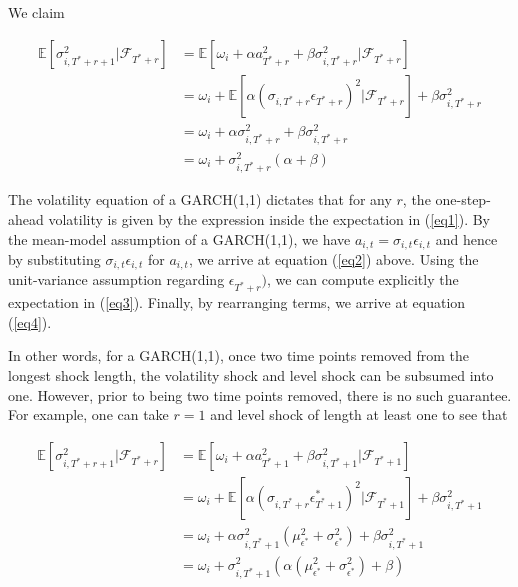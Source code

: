 \documentclass[11pt]{article}
\theoremstyle{definition}
\newenvironment{proof-of-proposition}[1][{}]{\noindent{\bf
    Proof of Proposition {#1}}
  \hspace*{.5em}}{\qed\bigskip\\}
\begin{document}
\begin{proof-of-proposition}
We claim

\begin{align}
\mathbb{E}[ \sigma^{2}_{i,T^{*}+r+1} |\mathcal{F}_{T^{*}+r}] & = \mathbb{E}[\omega_{i} + \alpha a_{T^{*}+r}^{2} + \beta\sigma^{2}_{i,T^{*}+r} |\mathcal{F}_{T^{*}+r}] \label{eq1}\\
& = \omega_{i} + \mathbb{E}[\alpha(\sigma_{i,T^{*}+r}\epsilon_{T^{*}+r})^{2} |\mathcal{F}_{T^{*}+r}] + \beta\sigma^{2}_{i,T^{*}+r} \label{eq2}\\
& = \omega_{i} + \alpha\sigma_{i,T^{*}+r}^{2} + \beta\sigma^{2}_{i,T^{*}+r} \label{eq3}\\
& = \omega_{i} + \sigma^{2}_{i,T^{*}+r}(\alpha + \beta) \label{eq4}
\end{align}

The volatility equation of a GARCH(1,1) dictates that for any $r$, the one-step-ahead volatility is given by the expression inside the expectation in (\ref{eq1}).  By the mean-model assumption of a GARCH(1,1), we have $a_{i,t} = \sigma_{i,t}\epsilon_{i,t}$ and hence by substituting $\sigma_{i,t}\epsilon_{i,t}$ for $a_{i,t}$, we arrive at equation (\ref{eq2}) above.  Using the unit-variance assumption regarding $\epsilon_{T^{*}+r})$, we can compute explicitly the expectation in (\ref{eq3}).  Finally, by rearranging terms, we arrive at equation (\ref{eq4}).
\end{proof-of-proposition}

In other words, for a GARCH(1,1), once two time points removed from the longest shock length, the volatility shock and level shock can be subsumed into one.  However, prior to being two time points removed, there is no such guarantee.  For example, one can take $r = 1$ and level shock of length at least one to see that 

\begin{align}
\mathbb{E}[ \sigma^{2}_{i,T^{*}+r+1} |\mathcal{F}_{T^{*}+r}] & = \mathbb{E}[\omega_{i} + \alpha a_{T^{*}+1}^{2} + \beta\sigma^{2}_{i,T^{*}+1} |\mathcal{F}_{T^{*}+1}] \\
& = \omega_{i} + \mathbb{E}[\alpha(\sigma_{i,T^{*}+r}\epsilon^{*}_{T^{*}+1})^{2} |\mathcal{F}_{T^{*}+1}] + \beta\sigma^{2}_{i,T^{*}+1} \\
& = \omega_{i} + \alpha\sigma^{2}_{i,T^{*}+1}(\mu^{2}_{\epsilon^{*}} + \sigma^{2}_{\epsilon^{*}}) + \beta\sigma^{2}_{i,T^{*}+1} \\
& = \omega_{i} + \sigma^{2}_{i,T^{*}+1}(\alpha(\mu^{2}_{\epsilon^{*}} + \sigma^{2}_{\epsilon^{*}}) + \beta)
\end{align}
\end{document}
